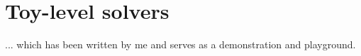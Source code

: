 \chapter{Toy-level solvers}

... which has been written by me and serves as a demonstration and playground.



